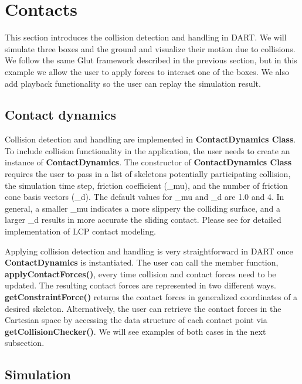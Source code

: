 \section{Contacts}
This section introduces the collision detection and handling in DART. We
will simulate three boxes and the ground and visualize their motion
due to collisions. We follow the same Glut framework described in the
previous section, but in this example we allow the user to apply
forces to interact one of the boxes. We also add playback
functionality so the user can replay the simulation result.

\subsection{Contact dynamics}
Collision detection and handling are implemented in
\textbf{ContactDynamics Class}. To include collision functionality in
the application, the user needs to create an instance of
\textbf{ContactDynamics}. The constructor of \textbf{ContactDynamics
  Class} requires the user to pass in a list of skeletons potentially
participating collision, the simulation time step, friction
coefficient (\_mu), and the number of friction cone basis vectors
(\_d). The default values for \_mu and \_d are 1.0 and 4. In general, a
smaller \_mu indicates a more slippery the colliding surface, and a
larger \_d results in more accurate the sliding contact. Please see
\cite{LCP-tutorial} for detailed implementation of LCP contact
modeling.

Applying collision detection and handling is very straightforward in
DART once \textbf{ContactDynamics} is instantiated. The user can call
the member function, \textbf{applyContactForces()}, every time
collision and contact forces need to be updated. The resulting contact
forces are represented in two different
ways. \textbf{getConstraintForce()} returns the contact forces in
generalized coordinates of a desired skeleton. Alternatively, the user
can retrieve the contact forces in the Cartesian space by accessing
the data structure of each contact point via
\textbf{getCollisionChecker()}. We will see examples of both cases in
the next subsection.

\subsection{Simulation}

